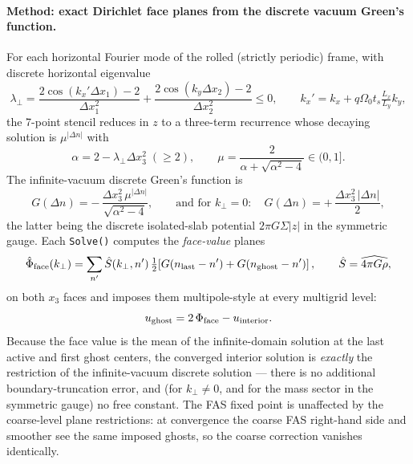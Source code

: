 \documentclass[11pt]{article}
\newcommand{\fn}[1]{\texttt{\small #1}}
\newcommand{\Om}{\Omega_0}
\begin{document}
\paragraph{Method: exact Dirichlet face planes from the discrete vacuum Green's
function.} For each horizontal Fourier mode of the rolled (strictly periodic) frame,
with discrete horizontal eigenvalue
\begin{equation}
  \lambda_\perp = \frac{2\cos(k_x'\Delta x_1)-2}{\Delta x_1^2}
                + \frac{2\cos(k_y \Delta x_2)-2}{\Delta x_2^2} \le 0 ,
  \qquad k_x' = k_x + q\Om t_s \tfrac{L_x}{L_y}k_y ,
\end{equation}
the 7-point stencil reduces in $z$ to a three-term recurrence whose decaying solution
is $\mu^{|\Delta n|}$ with
\begin{equation}
  \alpha = 2 - \lambda_\perp \Delta x_3^2 \;(\ge 2), \qquad
  \mu = \frac{2}{\alpha + \sqrt{\alpha^2-4}} \in (0,1] .
\end{equation}
The infinite-vacuum discrete Green's function is
\begin{equation}
  G(\Delta n) = -\,\frac{\Delta x_3^2\,\mu^{|\Delta n|}}{\sqrt{\alpha^2-4}},
  \qquad\text{and for } k_\perp = 0:\quad
  G(\Delta n) = +\,\frac{\Delta x_3^2\,|\Delta n|}{2},
\end{equation}
the latter being the discrete isolated-slab potential $2\pi G\Sigma|z|$ in the
symmetric gauge. Each \fn{Solve()} computes the \emph{face-value} planes
\begin{equation}
  \hat\Phi_{\rm face}(k_\perp)
  = \sum_{n'} \hat S(k_\perp, n')\,
    \tfrac12\!\left[G(n_{\rm last}-n') + G(n_{\rm ghost}-n')\right],
  \qquad \hat S = \widehat{4\pi G\rho},
\end{equation}
on both $x_3$ faces and imposes them multipole-style at every multigrid level:
\begin{equation}
  u_{\rm ghost} = 2\,\Phi_{\rm face} - u_{\rm interior} .
\end{equation}
Because the face value is the mean of the infinite-domain solution at the last active
and first ghost centers, the converged interior solution is \emph{exactly} the
restriction of the infinite-vacuum discrete solution --- there is no additional
boundary-truncation error, and (for $k_\perp \ne 0$, and for the mass sector in the
symmetric gauge) no free constant. The FAS fixed point is unaffected by the
coarse-level plane restrictions: at convergence the coarse FAS right-hand side and
smoother see the same imposed ghosts, so the coarse correction vanishes identically.
\end{document}
